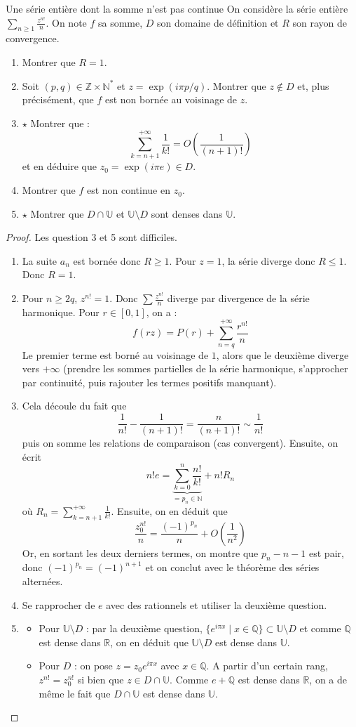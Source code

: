 \documentclass[french,a4paper]{article}
\newcommand{\N}{\mathbb{N}}
\newcommand{\Z}{\mathbb{Z}}
\newcommand{\Q}{\mathbb{Q}}
\newcommand{\R}{\mathbb{R}}
\newcommand{\U}{\mathbb{U}}
\newcommand{\st}{^*}
\theoremstyle{plain}
\theoremstyle{definition}
\theoremstyle{remark}
\begin{document}
\begin{ex}[Moulin.SE.54]{Une série entière dont la somme n'est pas continue}
	On considère la série entière $\displaystyle\sum_{n\geqslant 1}\frac{z^{n!}}{n}$. On note $f$ sa somme, $D$ son domaine de définition et $R$ son rayon de convergence.
	\begin{enumerate}
		\item Montrer que $R=1$.
		\item Soit $(p,q)\in\Z\times\N\st$ et $z=\exp(i\pi p/q)$. Montrer que $z\notin D$ et, plus précisément, que $f$ est non bornée au voisinage de $z$.
		\item $\star$ Montrer que : $$\sum_{k=n+1}^{+\infty}\frac{1}{k!}=O\left(\frac{1}{(n+1)!}\right)$$ et en déduire que $z_0=\exp(i\pi e)\in D$.
		\item Montrer que $f$ est non continue en $z_0$.
		\item $\star$ Montrer que $D\cap\U$ et $\U\setminus D$ sont denses dans $\U$.
	\end{enumerate}
\end{ex}
\begin{proof}
	Les question 3 et 5 sont difficiles.
	\begin{enumerate}
		\item La suite $a_n$ est bornée donc $R\geqslant 1$. Pour $z=1$, la série diverge donc $R\leqslant 1$. Donc $R=1$.
		\item Pour $n\geqslant 2q$, $z^{n!}=1$. Donc $\sum\frac{z^{n!}}{n}$ diverge par divergence de la série harmonique. Pour $r\in[0,1]$, on a : $$f(rz)=P(r)+\sum_{n=q}^{+\infty}\frac{r^{n!}}{n}$$ Le premier terme est borné au voisinage de $1$, alors que le deuxième diverge vers $+\infty$ (prendre les sommes partielles de la série harmonique, s'approcher par continuité, puis rajouter les termes positifs manquant).
		\item Cela découle du fait que $$\frac{1}{n!}-\frac{1}{(n+1)!}=\frac{n}{(n+1)!}\sim\frac{1}{n!}$$ puis on somme les relations de comparaison (cas convergent). Ensuite, on écrit $$n!e=\underbrace{\sum_{k=0}^{n}\frac{n!}{k!}}_{=p_n\in\N}+n!R_n$$ où $\displaystyle R_n=\sum_{k=n+1}^{+\infty}\frac{1}{k!}$. Ensuite, on en déduit que $$\frac{z_0^{n!}}{n}=\frac{(-1)^{p_n}}{n}+O\left(\frac{1}{n^2}\right)$$ Or, en sortant les deux derniers termes, on montre que $p_n-n-1$ est pair, donc $(-1)^{p_n}=(-1)^{n+1}$ et on conclut avec le théorème des séries alternées.
		\item Se rapprocher de $e$ avec des rationnels et utiliser la deuxième question.
		\item \begin{itemize}
			\item Pour $\U\setminus D$ : par la deuxième question, $\{e^{i\pi x}\mid x\in\Q\}\subset\U\setminus D$ et comme $\Q$ est dense dans $\R$, on en déduit que $\U\setminus D$ est dense dans $\U$.
			\item Pour $D$ : on pose $z=z_{0}e^{i\pi x}$ avec $x\in\Q$. A partir d'un certain rang, $z^{n!}=z_0^{n!}$ si bien que $z\in D\cap \U$. Comme $e+\Q$ est dense dans $\R$, on a de même le fait que $D\cap\U$ est dense dans $\U$.
		\end{itemize}
	\end{enumerate}
\end{proof}
\end{document}
